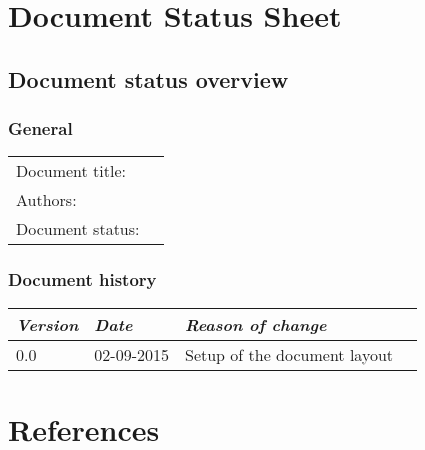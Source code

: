 

\title{}
\newcommand{\TitelAbbr}{}
\newcommand{\Version}{0.1}



\what{}
\supervisors{}
\author{}




\maketitle


\tableofcontents

\chapter*{Document Status Sheet}
\section*{Document status overview}
\subsection*{General}
\begin{tabular}[!]{ll}
    Document title:     & \\
    Authors:           	& \\
    Document status:    & \\
\end{tabular}

\subsection*{Document history}
\begin{tabular}[!]{|l|l|l|l|}
    \hline
    \emph{Version}    &   \emph{Date} &  \emph{Reason of change}\\
    \hline
    0.0 & 02-09-2015 &  Setup of the document layout\\    
    \hline
\end{tabular}

\clearpage



\chapter{References}

\begin{thebibliography}{9}
	
\end{thebibliography}


\appendix



